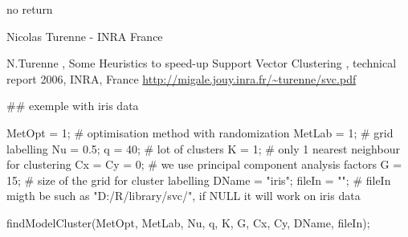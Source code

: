 \documentclass{article}
\begin{document}
\begin{Value}
no return
\end{Value}
\begin{Author}\relax
Nicolas Turenne - INRA France 
\end{Author}
\begin{References}\relax
N.Turenne , Some Heuristics to speed-up Support Vector Clustering , technical report 2006, INRA, France 
\url{http://migale.jouy.inra.fr/~turenne/svc.pdf}
\end{References}
\begin{Examples}
\begin{ExampleCode}

## exemple with iris data

MetOpt  = 1;    # optimisation method with randomization
MetLab  = 1;    # grid labelling
Nu      = 0.5; 
q       = 40;   # lot of clusters
K       = 1;    # only 1  nearest neighbour for clustering
Cx = Cy = 0; # we use principal component analysis factors
G       = 15; # size of the grid for cluster labelling
DName   = "iris";
fileIn  = ""; # fileIn migth be such as "D:/R/library/svc/", if NULL it will work on iris data

findModelCluster(MetOpt, MetLab, Nu, q, K, G, Cx, Cy, DName, fileIn); 

\end{ExampleCode}
\end{Examples}
\end{document}
